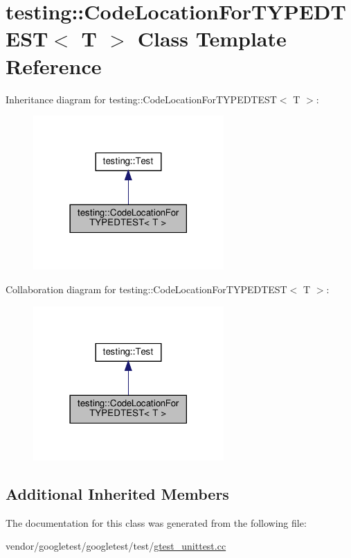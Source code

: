 \hypertarget{classtesting_1_1_code_location_for_t_y_p_e_d_t_e_s_t}{}\section{testing\+:\+:Code\+Location\+For\+T\+Y\+P\+E\+D\+T\+E\+ST$<$ T $>$ Class Template Reference}
\label{classtesting_1_1_code_location_for_t_y_p_e_d_t_e_s_t}


Inheritance diagram for testing\+:\+:Code\+Location\+For\+T\+Y\+P\+E\+D\+T\+E\+ST$<$ T $>$\+:
\nopagebreak
\begin{figure}[H]
\begin{center}
\leavevmode
\includegraphics[width=206pt]{classtesting_1_1_code_location_for_t_y_p_e_d_t_e_s_t__inherit__graph}
\end{center}
\end{figure}


Collaboration diagram for testing\+:\+:Code\+Location\+For\+T\+Y\+P\+E\+D\+T\+E\+ST$<$ T $>$\+:
\nopagebreak
\begin{figure}[H]
\begin{center}
\leavevmode
\includegraphics[width=206pt]{classtesting_1_1_code_location_for_t_y_p_e_d_t_e_s_t__coll__graph}
\end{center}
\end{figure}
\subsection*{Additional Inherited Members}


The documentation for this class was generated from the following file\+:\begin{DoxyCompactItemize}
\item 
vendor/googletest/googletest/test/\hyperlink{gtest__unittest_8cc}{gtest\+\_\+unittest.\+cc}\end{DoxyCompactItemize}

